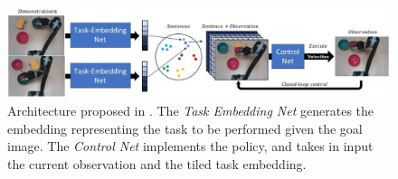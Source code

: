 \begin{figure}[t]
    \centering
    \includegraphics[width=\textwidth]{figures/images/task_embedded/task_embedded.jpg}
    \caption{Architecture proposed in \cite{james2018task_embedded}. The \textit{Task Embedding Net} generates the embedding representing the task to be performed given the goal image. The \textit{Control Net} implements the policy, and takes in input the current observation and the tiled task embedding.}
    \label{fig:task_embedded}
\end{figure}
